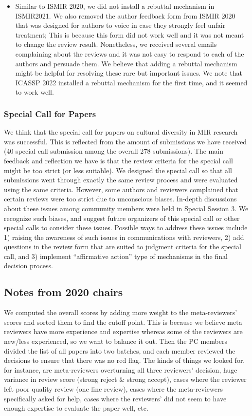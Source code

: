 \documentclass[%
10pt,								%
titlepage,						%
]
{scrartcl}
\begin{document}
\begin{itemize}
                \item   Similar to ISMIR 2020, we did not install a rebuttal mechanism in ISMIR2021. We also removed the author feedback form from ISMIR 2020 that was designed for authors to voice in case they strongly feel unfair treatment; This is because this form did not work well and it was not meant to change the review result. Nonetheless, we received several emails complaining about the reviews and it was not easy to respond to each of the authors and persuade them. We believe that adding a rebuttal mechanism might be helpful for resolving these rare but important issues. We note that ICASSP 2022 installed a rebuttal mechanism for the first time, and it seemed to work well.
            \end{itemize}
        
        \subsubsection{Special Call for Papers}\label{sec:prog_specialcall}
            We think that the special call for papers on cultural diversity in MIR research was successful. This is reflected from the amount of submissions we have received (40 special call submission among the overall 278 submissions). The main feedback and reflection we have is that the review criteria for the special call might be too strict (or less suitable). We designed the special call so that all submissions went through exactly the same review process and were evaluated using the same criteria. However, some authors and reviewers complained that certain reviews were too strict due to unconscious biases. In-depth discussions about these issues among community members were held in Special Session 3. We recognize such biases, and suggest future organizers of this special call or other special calls to consider these issues. Possible ways to address these issues include 1) raising the awareness of such issues in communications with reviewers, 2) add questions in the review form that are suited to judgment criteria for the special call, and 3) implement ``affirmative action'' type of mechanisms in the final decision process.

        \subsection{Notes from 2020 chairs}
            We computed the overall scores by adding more weight to the meta-reviewers' scores and sorted them to find the cutoff point. This is because we believe meta reviewers have more experience and expertise whereas some of the reviewers are new/less experienced, so we want to balance it out.
            Then the PC members divided the list of all papers into two batches, and each member reviewed the decisions to ensure that there was no red flag. The kinds of things we looked for, for instance, are meta-reviewers overturning all three reviewers' decision, huge variance in review score (strong reject \& strong accept), cases where the reviewer left poor quality review (one line review), cases where the meta-reviewers specifically asked for help, cases where the reviewers' did not seem to have enough expertise to evaluate the paper well, etc.
\end{document}
